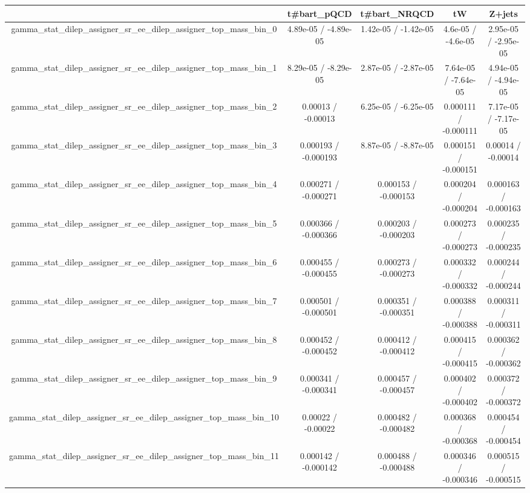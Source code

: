 \documentclass[10pt]{article}
\begin{document}
\begin{table}[htbp]
\begin{center}
\begin{tabular}{|c|c|c|c|c|}
\hline 
      & t#bar{t}_{pQCD}      & t#bar{t}_{NRQCD}      & tW      & Z+jets \\ 
\hline 
  gamma_stat_dilep_assigner_sr_ee_dilep_assigner_top_mass_bin_0 & 4.89e-05 / -4.89e-05 & 1.42e-05 / -1.42e-05 & 4.6e-05 / -4.6e-05 & 2.95e-05 / -2.95e-05 \\ 
  gamma_stat_dilep_assigner_sr_ee_dilep_assigner_top_mass_bin_1 & 8.29e-05 / -8.29e-05 & 2.87e-05 / -2.87e-05 & 7.64e-05 / -7.64e-05 & 4.94e-05 / -4.94e-05 \\ 
  gamma_stat_dilep_assigner_sr_ee_dilep_assigner_top_mass_bin_2 & 0.00013 / -0.00013 & 6.25e-05 / -6.25e-05 & 0.000111 / -0.000111 & 7.17e-05 / -7.17e-05 \\ 
  gamma_stat_dilep_assigner_sr_ee_dilep_assigner_top_mass_bin_3 & 0.000193 / -0.000193 & 8.87e-05 / -8.87e-05 & 0.000151 / -0.000151 & 0.00014 / -0.00014 \\ 
  gamma_stat_dilep_assigner_sr_ee_dilep_assigner_top_mass_bin_4 & 0.000271 / -0.000271 & 0.000153 / -0.000153 & 0.000204 / -0.000204 & 0.000163 / -0.000163 \\ 
  gamma_stat_dilep_assigner_sr_ee_dilep_assigner_top_mass_bin_5 & 0.000366 / -0.000366 & 0.000203 / -0.000203 & 0.000273 / -0.000273 & 0.000235 / -0.000235 \\ 
  gamma_stat_dilep_assigner_sr_ee_dilep_assigner_top_mass_bin_6 & 0.000455 / -0.000455 & 0.000273 / -0.000273 & 0.000332 / -0.000332 & 0.000244 / -0.000244 \\ 
  gamma_stat_dilep_assigner_sr_ee_dilep_assigner_top_mass_bin_7 & 0.000501 / -0.000501 & 0.000351 / -0.000351 & 0.000388 / -0.000388 & 0.000311 / -0.000311 \\ 
  gamma_stat_dilep_assigner_sr_ee_dilep_assigner_top_mass_bin_8 & 0.000452 / -0.000452 & 0.000412 / -0.000412 & 0.000415 / -0.000415 & 0.000362 / -0.000362 \\ 
  gamma_stat_dilep_assigner_sr_ee_dilep_assigner_top_mass_bin_9 & 0.000341 / -0.000341 & 0.000457 / -0.000457 & 0.000402 / -0.000402 & 0.000372 / -0.000372 \\ 
  gamma_stat_dilep_assigner_sr_ee_dilep_assigner_top_mass_bin_10 & 0.00022 / -0.00022 & 0.000482 / -0.000482 & 0.000368 / -0.000368 & 0.000454 / -0.000454 \\ 
  gamma_stat_dilep_assigner_sr_ee_dilep_assigner_top_mass_bin_11 & 0.000142 / -0.000142 & 0.000488 / -0.000488 & 0.000346 / -0.000346 & 0.000515 / -0.000515 \\ 

\end{tabular}
\end{center}
\end{table}
\end{document}

